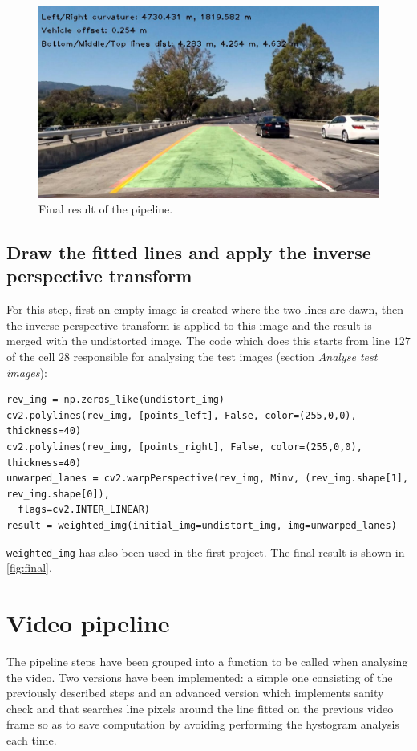 \documentclass{article}
\let\cd\lstinline
\begin{document}
\begin{figure}
\centering
\includegraphics[scale=0.25]{output_images/test1/11_unwarped_lanes}
\caption{Final result of the pipeline.}
\label{fig:final}
\end{figure}

\subsection{Draw the fitted lines and apply the inverse perspective transform}
For this step, first an empty image is created where the two lines are dawn, then the inverse perspective transform is applied to this image and the result is merged with the undistorted image. The code which does this starts from line $127$ of the cell $28$ responsible for analysing the test images (section \textit{Analyse test images}):
\begin{lstlisting}
rev_img = np.zeros_like(undistort_img)
cv2.polylines(rev_img, [points_left], False, color=(255,0,0), thickness=40)
cv2.polylines(rev_img, [points_right], False, color=(255,0,0), thickness=40)
unwarped_lanes = cv2.warpPerspective(rev_img, Minv, (rev_img.shape[1], rev_img.shape[0]), 
  flags=cv2.INTER_LINEAR)
result = weighted_img(initial_img=undistort_img, img=unwarped_lanes) 
\end{lstlisting}
\cd+weighted_img+ has also been used in the first project. The final result is shown in \autoref{fig:final}.

\section{Video pipeline}
The pipeline steps have been grouped into a function to be called when analysing the video. Two versions have been implemented: a simple one consisting of the previously described steps and an advanced version which implements sanity check and that searches line pixels around the line fitted on the previous video frame so as to save computation by avoiding performing the hystogram analysis each time.
\end{document}
